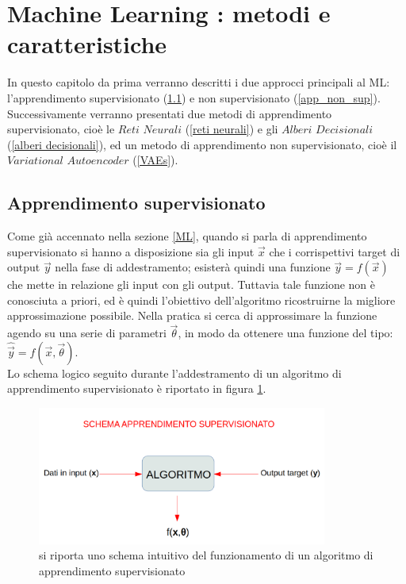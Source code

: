 \section{Machine Learning : metodi e caratteristiche}
\label{ML: metodi e caratteristiche}

In questo capitolo da prima verranno descritti i due approcci principali al ML: l'apprendimento supervisionato (\ref{app_sup}) e non supervisionato (\ref{app_non_sup}). Successivamente verranno presentati due metodi di apprendimento supervisionato, cioè le $\textit{Reti Neurali}$ (\ref{reti neurali}) e gli $\textit{Alberi Decisionali}$ (\ref{alberi decisionali}), ed un metodo di apprendimento non supervisionato, cioè il $\textit{Variational Autoencoder}$ (\ref{VAEs}).


\subsection{Apprendimento supervisionato}
\label{app_sup}
Come già accennato nella sezione \ref{ML}, quando si parla di apprendimento supervisionato si hanno a disposizione sia gli input $\vec{x}$ che i corrispettivi target di output $\vec{y}$ nella fase di addestramento; esisterà quindi una funzione 
$\vec{y} = f(\vec{x})$ che mette in relazione gli input con gli output. Tuttavia tale funzione non è conosciuta a priori, ed è quindi l'obiettivo dell'algoritmo ricostruirne la migliore approssimazione possibile.
Nella pratica si cerca di approssimare la funzione agendo su una serie di parametri $\vec{\theta}$, in modo da ottenere una funzione del tipo: $\hat{\vec{y}} = f(\vec{x},\vec{\theta})$. \\
Lo schema logico seguito durante l'addestramento di un algoritmo di apprendimento supervisionato è riportato in figura \ref{fig:schema_app_sup}.

\begin{figure}[h!]
	\centering
	\includegraphics[width=0.85\textwidth]{figs/App_sup.png}
	\caption{si riporta uno schema intuitivo del funzionamento di un algoritmo di apprendimento supervisionato}
	\label{fig:schema_app_sup}
\end{figure}


